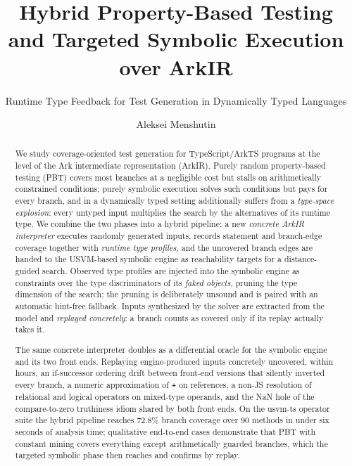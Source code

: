 \documentclass[sigconf,nonacm,screen]{acmart}
\begin{document}
\title{Hybrid Property-Based Testing and Targeted Symbolic Execution over ArkIR}
\subtitle{Runtime Type Feedback for Test Generation in Dynamically Typed Languages}

\author{Aleksei Menshutin}

\begin{abstract}
We study coverage-oriented test generation for TypeScript/ArkTS programs
at the level of the Ark intermediate representation (ArkIR). Purely random
property-based testing (PBT) covers most branches at a negligible cost but
stalls on arithmetically constrained conditions; purely symbolic execution
solves such conditions but pays for every branch, and in a dynamically typed
setting additionally suffers from a \emph{type-space explosion}: every
untyped input multiplies the search by the alternatives of its runtime type.
We combine the two phases into a hybrid pipeline: a new \emph{concrete ArkIR
interpreter} executes randomly generated inputs, records statement and
branch-edge coverage together with \emph{runtime type profiles}, and the
uncovered branch edges are handed to the USVM-based symbolic engine as
reachability targets for a distance-guided search. Observed type profiles
are injected into the symbolic engine as constraints over the type
discriminators of its \emph{faked objects}, pruning the type dimension of
the search; the pruning is deliberately unsound and is paired with an
automatic hint-free fallback. Inputs synthesized by the solver are extracted
from the model and \emph{replayed concretely}: a branch counts as covered
only if its replay actually takes it.

The same concrete interpreter doubles as a differential oracle for the
symbolic engine and its two front ends. Replaying engine-produced inputs
concretely uncovered, within hours, an if-successor ordering drift between
front-end versions that silently inverted every branch, a numeric
approximation of \texttt{+} on references, a non-JS resolution of relational
and logical operators on mixed-type operands, and the NaN hole of the
compare-to-zero truthiness idiom shared by both front ends. On the
usvm-ts operator suite the hybrid pipeline reaches 72.8\% branch coverage
over 90 methods in under six seconds of analysis time; qualitative
end-to-end cases demonstrate that PBT with constant mining covers everything
except arithmetically guarded branches, which the targeted symbolic phase
then reaches and confirms by replay.
\end{abstract}
\end{document}
